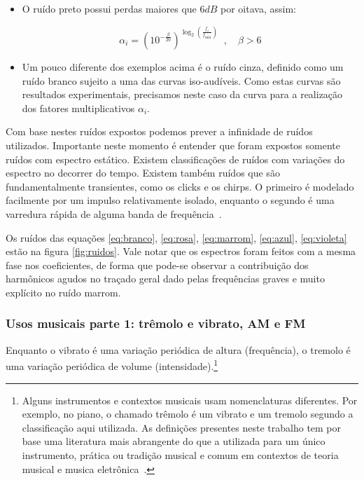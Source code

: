 \begin{itemize}
\item O ruído preto possui perdas maiores que $6dB$ por oitava, assim:

\begin{equation}\label{eq:preto}
\alpha_i=(10^{-\frac{\beta}{20}})^{\log _2 \left( \frac{f_i}{f_{\text{min}}} \right )}\;\;, \quad \beta > 6
\end{equation}



\item Um pouco diferente dos exemplos acima é o ruído cinza, definido como
um ruído branco sujeito a uma das curvas iso-audíveis. Como estas curvas são resultados
experimentais, precisamos neste caso da curva para a realização dos fatores multiplicativos
$\alpha_i$.

\end{itemize}

Com base nestes ruídos expostos podemos prever a infinidade de ruídos utilizados. Importante
neste momento é entender que foram expostos somente ruídos com espectro estático. Existem classificações
de ruídos com variações do espectro no decorrer do tempo. Existem também ruídos que
são fundamentalmente transientes, como os clicks e os chirps. O primeiro é modelado
facilmente por um impulso relativamente isolado, enquanto o segundo é uma varredura rápida de 
alguma banda de frequência~\cite{Cook}.

Os ruídos das equações \ref{eq:branco}, \ref{eq:rosa}, \ref{eq:marrom},
\ref{eq:azul}, \ref{eq:violeta} estão na figura \ref{fig:ruidos}. Vale notar
que os espectros foram feitos com a mesma fase nos coeficientes, de forma que
pode-se observar a contribuição dos harmônicos agudos no traçado geral dado
pelas frequências graves e muito explícito no ruído marrom.


\subsubsection{Usos musicais parte 1: trêmolo e vibrato, AM e FM}

Enquanto o vibrato é uma variação periódica de altura (frequência),
o tremolo é uma variação periódica de volume (intensidade).\footnote{Alguns instrumentos e contextos musicais usam nomenclaturas diferentes. Por exemplo, no piano, o chamado trêmolo é um vibrato e um tremolo segundo a classificação aqui utilizada. As definições presentes neste trabalho tem por base uma literatura mais abrangente do que a utilizada para um único instrumento, prática ou tradição musical e comum em contextos de teoria musical e musica eletrônica~\cite{Lacerda,Harmonia}.}

